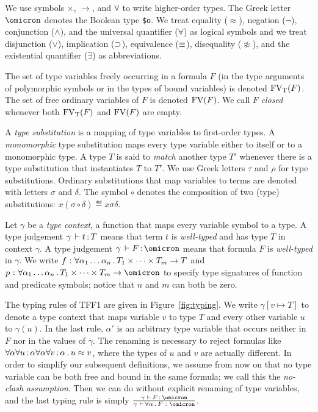 We use symbols ${\times}$, ${\to}$, and ${\forall}$
to write higher-order types. The Greek letter $\omicron$ denotes
the Boolean type {\tt \$o}. We treat equality ($\approx$),
negation ($\lnot$), conjunction ($\land$), and the universal
quantifier ($\forall$) as logical symbols and we treat
disjunction ($\lor$), implication ($\supset$), equivalence
($\equiv$), disequality ($\not\approx$), and the existential
quantifier ($\exists$) as abbreviations.

The set of type variables freely occurring in a formula $F$
(in the type arguments of polymorphic symbols or
in the types of bound variables) is denoted $\mathrm{FV}_\mathrm{T}(F)$.
The set of free ordinary variables of $F$
is denoted $\mathrm{FV}(F)$. We call $F$ {\em closed\/}
whenever both $\mathrm{FV}_\mathrm{T}(F)$ and $\mathrm{FV}(F)$ are empty.

A {\em type substitution\/} is a mapping of type variables
to first-order types. A {\em monomorphic\/} type substitution
maps every type variable either to itself or to a monomorphic type.
%
A type $T$ is said to {\em match\/} another type $T'$ whenever
there is a type substitution that instantiates $T$ to $T'$.
We use Greek letters $\tau$ and $\rho$ for type substitutions.
%
Ordinary substitutions that map variables to terms
are denoted with letters $\sigma$ and $\delta$.
The symbol $\circ$ denotes the composition
of two (type) substitutions:
$x(\sigma \circ \delta) \eqdef x\sigma\delta$.

Let $\gamma$ be a {\em type context}, a function that maps
every variable symbol to a type.
A type judgement $\gamma \,\vdash t \operatorname{:} T$ means that term $t$
is {\em well-typed\/} and has type $T$ in context $\gamma$.
A type judgement $\gamma \,\vdash F \ty \omicron$ means that formula $F$
is {\em well-typed\/} in $\gamma$.
We write $f \,\operatorname{:}\, \forall \alpha_1\dots\alpha_n \,.\,
T_1 \times \dots \times T_m \to T$ and
$p \,\ty\, \forall \alpha_1\dots\alpha_n \,.\,
T_1 \times \dots \times T_m \to \omicron$ to specify
type signatures of function and predicate symbols;
notice that $n$ and $m$ can both be zero.

The typing rules of TFF1 are given in Figure~\ref{fig:typing}.
We write $\gamma[v \mapsto T]$ to denote a type context that maps
variable $v$ to type $T$ and every other variable $u$ to $\gamma(u)$.
In the last rule, $\alpha'$ is an arbitrary type variable that
occurs neither in $F$ nor in the values of $\gamma$.
The renaming is necessary to reject formulas like
$\forall\alpha\forall u\operatorname{:}\alpha\forall\alpha\forall v\operatorname{:}\alpha \,.\,
u \approx v$, where the types of $u$ and $v$ are actually different.
In order to simplify our subsequent definitions, we assume from now on
that no type variable can be both free and bound in the same formula;
we call this the {\em no-clash assumption}.
Then we can do without explicit renaming of type variables,
and the last typing rule is simply
$\frac{\gamma\, \,\vdash\, F \ty \omicron}{
\gamma\, \,\vdash\, \forall \alpha \,.\, F \,\ty\, \omicron}$.

